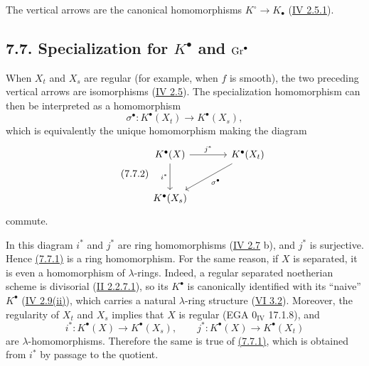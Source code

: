 The vertical arrows are the canonical homomorphisms
$K^\circ\to K_\bullet$ (\hyperlink{sga6.e04.eq.2-5-1}{IV 2.5.1}).

\subsection*{7.7. Specialization for $K^\bullet$ and $\operatorname{Gr}^\bullet$}
When $X_t$ and $X_s$ are regular (for example, when $f$ is smooth), the two
preceding vertical arrows are isomorphisms (\hyperlink{sga6.e04.para.2-5}{IV 2.5}). The specialization
homomorphism can then be interpreted as a homomorphism
\begin{equation}\tag{7.7.1}
\sigma^\bullet:K^\bullet(X_t)\longrightarrow K^\bullet(X_s),
\end{equation}
which is equivalently the unique homomorphism making the diagram
\begin{equation}\tag{7.7.2}
\begin{tikzcd}[column sep=large,row sep=large]
K^\bullet(X) \arrow[r,"j^*"] \arrow[d,"i^*"'] &
K^\bullet(X_t) \arrow[dl,"\sigma^\bullet"]\\
K^\bullet(X_s) &
\end{tikzcd}
\end{equation}
commute.

In this diagram $i^*$ and $j^*$ are ring homomorphisms (\hyperlink{sga6.e04.para.2-7}{IV 2.7} b), and
$j^*$ is surjective. Hence \hyperlink{sga6.e10.eq.7-7-1}{(7.7.1)} is a ring homomorphism. For the same
reason, if $X$ is separated, it is even a homomorphism of $\lambda$-rings.
Indeed, a regular separated noetherian scheme is divisorial (\hyperlink{sga6.e02.cor.2-2-7-1}{II 2.2.7.1}),
so its $K^\bullet$ is canonically identified with its ``naive''
$K^\bullet$ (\hyperlink{sga6.e04.para.2-9}{IV 2.9(ii)}), which carries a natural $\lambda$-ring structure
(\hyperlink{sga6.e06.thm.3-2}{VI 3.2}). Moreover, the regularity of $X_t$ and $X_s$ implies that $X$ is
regular (EGA $0_{\mathrm{IV}}$ 17.1.8), and
\[
i^*:K^\bullet(X)\longrightarrow K^\bullet(X_s),
\qquad
j^*:K^\bullet(X)\longrightarrow K^\bullet(X_t)
\]
are $\lambda$-homomorphisms. Therefore the same is true of \hyperlink{sga6.e10.eq.7-7-1}{(7.7.1)}, which
is obtained from $i^*$ by passage to the quotient.

